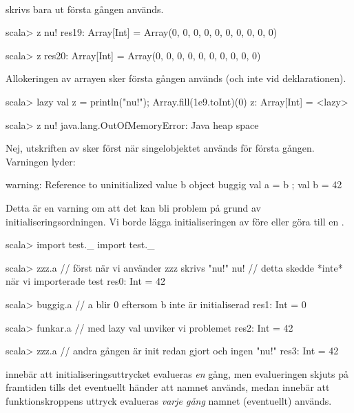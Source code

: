 \TaskSolved \what~

\SubtaskSolved {} skrivs bara ut första gången  används.
\begin{REPL}
scala> z
nu!
res19: Array[Int] = Array(0, 0, 0, 0, 0, 0, 0, 0, 0, 0)

scala> z
res20: Array[Int] = Array(0, 0, 0, 0, 0, 0, 0, 0, 0, 0)
\end{REPL}

\SubtaskSolved Allokeringen av arrayen sker första gången  används (och inte vid deklarationen).
\begin{REPL}
scala> lazy val z = { println("nu!"); Array.fill(1e9.toInt)(0)}
z: Array[Int] = <lazy>

scala> z
nu!
java.lang.OutOfMemoryError: Java heap space
\end{REPL}

\SubtaskSolved Nej, utskriften av  sker först när singelobjektet  används för första gången. Varningen lyder:
\begin{REPL}
warning: Reference to uninitialized value b
         object buggig { val a = b ; val b = 42}
\end{REPL}
\noindent Detta är en varning om att det kan bli problem på grund av initialiseringsordningen. Vi borde lägga initialiseringen av  före  eller göra  till en .

\SubtaskSolved
\begin{REPL}
scala> import test._
import test._

scala> zzz.a      // först när vi använder zzz skrivs "nu!"
nu!               // detta skedde *inte* när vi importerade test
res0: Int = 42

scala> buggig.a   // a blir 0 eftersom b inte är initialiserad
res1: Int = 0

scala> funkar.a   // med lazy val unviker vi problemet
res2: Int = 42


scala> zzz.a     // andra gången är init redan gjort och ingen "nu!"
res3: Int = 42
\end{REPL}

\SubtaskSolved {} innebär att initialiseringsuttrycket evalueras \emph{en} gång, men evalueringen skjuts på framtiden tills det eventuellt händer att namnet  används, medan  innebär att funktionskroppens uttryck evalueras \emph{varje gång} namnet  (eventuellt) används.


\QUESTEND





